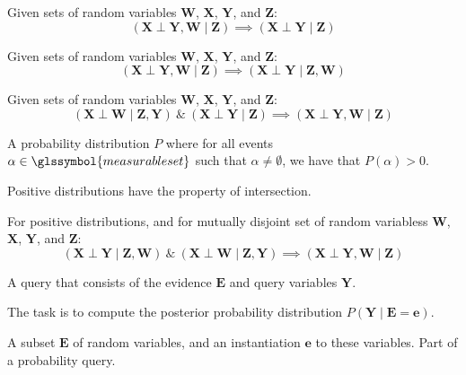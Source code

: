 {%
  Given sets of random variables $\bm{W}$, $\bm{X}$, $\bm{Y}$, and $\bm{Z}$:
  \begin{equation*}
    (\bm{X}\perp\bm{Y},\bm{W}\mid\bm{Z})\implies(\bm{X}\perp\bm{Y}\mid\bm{Z})
  \end{equation*}
}

{%
  Given sets of random variables $\bm{W}$, $\bm{X}$, $\bm{Y}$, and $\bm{Z}$:
  \begin{equation*}
    (\bm{X}\perp\bm{Y},\bm{W}\mid \bm{Z})\implies(\bm{X}\perp\bm{Y}\mid\bm{Z},\bm{W})
  \end{equation*}
}

{%
  Given sets of random variables $\bm{W}$, $\bm{X}$, $\bm{Y}$, and $\bm{Z}$:
  \begin{equation*}
    (\bm{X}\perp\bm{W}\mid\bm{Z},\bm{Y})~\&~(\bm{X}\perp\bm{Y}\mid\bm{Z})\implies(\bm{X}\perp\bm{Y},\bm{W}\mid\bm{Z})
  \end{equation*}
}

{%
  A \gls{probability distribution} $P$ where for all events $\alpha\in\glssymbol{measurable set}$ such that $\alpha\neq\emptyset$, we have that $P(\alpha)>0$.

  Positive distributions have the property of \gls{intersection}.
}

{%
  For \glspl{positive distribution}, and for mutually disjoint \glspl{set of random variables} $\bm{W}$, $\bm{X}$, $\bm{Y}$, and $\bm{Z}$:
  \begin{equation*}
    (\bm{X}\perp\bm{Y}\mid\bm{Z},\bm{W})~\&~(\bm{X}\perp\bm{W}\mid\bm{Z},\bm{Y})\implies(\bm{X}\perp\bm{Y},\bm{W}\mid\bm{Z})
  \end{equation*}
}

{%
  A query that consists of the \gls{evidence} $\bm{E}$ and \gls{query variables} $\bm{Y}$.

  The task is to compute the \gls{posterior probability distribution} $P(\bm{Y}\mid\bm{E}=\bm{e})$.
}

{%
}


{%
  A subset $\bm{E}$ of \glspl{random variable}, and an instantiation $\bm{e}$ to these variables. Part of a \gls{probability query}.
}

